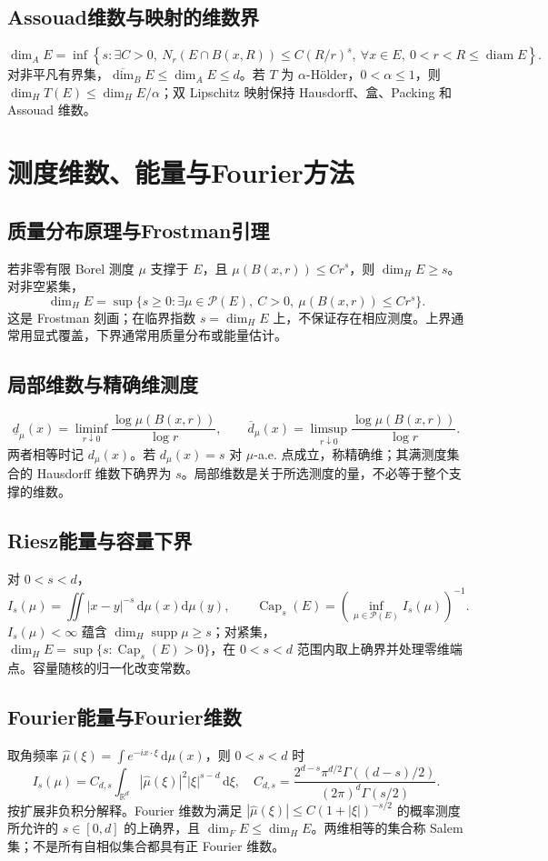 \documentclass[../main.tex]{subfiles}
\begin{document}
\subsection{Assouad维数与映射的维数界}
\[
\dim_AE=\inf\left\{s:\exists C>0,\ N_r(E\cap B(x,R))\le C(R/r)^s,
\ \forall x\in E,\ 0<r<R\le\operatorname{diam}E\right\}.
\]
对非平凡有界集，$\overline{\dim}_BE\le\dim_AE\le d$。若 $T$ 为 $\alpha$-Hölder，$0<\alpha\le1$，则 $\dim_HT(E)\le\dim_HE/\alpha$；双 Lipschitz 映射保持 Hausdorff、盒、Packing 和 Assouad 维数。
\section{测度维数、能量与Fourier方法}
\subsection{质量分布原理与Frostman引理}
若非零有限 Borel 测度 $\mu$ 支撑于 $E$，且 $\mu(B(x,r))\le Cr^s$，则 $\dim_HE\ge s$。对非空紧集，
\[
\dim_HE=\sup\{s\ge0:\exists\mu\in\mathcal P(E),\ C>0,\ \mu(B(x,r))\le Cr^s\}.
\]
这是 Frostman 刻画；在临界指数 $s=\dim_HE$ 上，不保证存在相应测度。上界通常用显式覆盖，下界通常用质量分布或能量估计。
\subsection{局部维数与精确维测度}
\[
\underline d_\mu(x)=\liminf_{r\downarrow0}\frac{\log\mu(B(x,r))}{\log r},\qquad
\overline d_\mu(x)=\limsup_{r\downarrow0}\frac{\log\mu(B(x,r))}{\log r}.
\]
两者相等时记 $d_\mu(x)$。若 $d_\mu(x)=s$ 对 $\mu$-a.e. 点成立，称精确维；其满测度集合的 Hausdorff 维数下确界为 $s$。局部维数是关于所选测度的量，不必等于整个支撑的维数。
\subsection{Riesz能量与容量下界}
对 $0<s<d$，
\[
I_s(\mu)=\iint|x-y|^{-s}\,\mathrm d\mu(x)\mathrm d\mu(y),\qquad
\operatorname{Cap}_s(E)=\left(\inf_{\mu\in\mathcal P(E)}I_s(\mu)\right)^{-1}.
\]
$I_s(\mu)<\infty$ 蕴含 $\dim_H\operatorname{supp}\mu\ge s$；对紧集，$\dim_HE=\sup\{s:\operatorname{Cap}_s(E)>0\}$，在 $0<s<d$ 范围内取上确界并处理零维端点。容量随核的归一化改变常数。
\subsection{Fourier能量与Fourier维数}
取角频率 $\widehat\mu(\xi)=\int e^{-ix\cdot\xi}\,\mathrm d\mu(x)$，则 $0<s<d$ 时
\[
I_s(\mu)=C_{d,s}\int_{\mathbb R^d}|\widehat\mu(\xi)|^2|\xi|^{s-d}\,\mathrm d\xi,
\quad C_{d,s}=\frac{2^{d-s}\pi^{d/2}\Gamma((d-s)/2)}{(2\pi)^d\Gamma(s/2)}.
\]
按扩展非负积分解释。Fourier 维数为满足 $|\widehat\mu(\xi)|\le C(1+|\xi|)^{-s/2}$ 的概率测度所允许的 $s\in[0,d]$ 的上确界，且 $\dim_FE\le\dim_HE$。两维相等的集合称 Salem 集；不是所有自相似集合都具有正 Fourier 维数。
\end{document}
